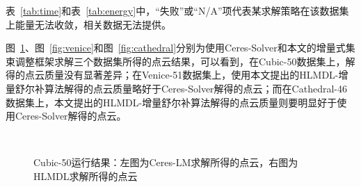 表~\ref{tab:time}和表~\ref{tab:energy}中，“失败”或“N/A”项代表某求解策略在该数据集上能量无法收敛，相关数据无法提供。

图~\ref{fig:cubic}、图~\ref{fig:venice}和图~\ref{fig:cathedral}分别为使用Ceres-Solver和本文的增量式集束调整框架求解三个数据集所得的点云结果，可以看到，在Cubic-50数据集上，解得的点云质量没有显著差异；在Venice-51数据集上，使用本文提出的HLMDL-增量舒尔补算法解得的点云质量略好于Ceres-Solver解得的点云；而在Cathedral-46数据集上，本文提出的HLMDL-增量舒尔补算法解得的点云质量则要明显好于使用Ceres-Solver解得的点云。

\begin{figure}[htb!]
    \centering
    ~
    \caption{Cubic-50运行结果：左图为Ceres-LM求解所得的点云，右图为HLMDL求解所得的点云}
    \label{fig:cubic}
\end{figure}

